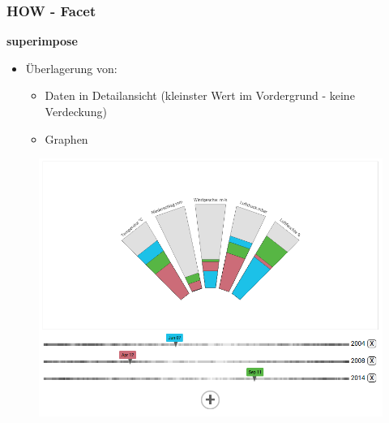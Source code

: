 \documentclass{beamer}
\begin{document}
  \begin{frame}
  \frametitle{HOW - Facet}
    \textbf{superimpose}
    \begin{itemize}
     \item Überlagerung von:
     \begin{itemize}
      \item Daten in Detailansicht (kleinster Wert im Vordergrund - keine Verdeckung)
      \item Graphen
     \end{itemize}
    \end{itemize}
    \begin{figure}[h]
      \centering
      \includegraphics[width=.4\paperwidth,keepaspectratio=true]{./media/superimpose.png}
    \end{figure}
  \end{frame}
\end{document}
